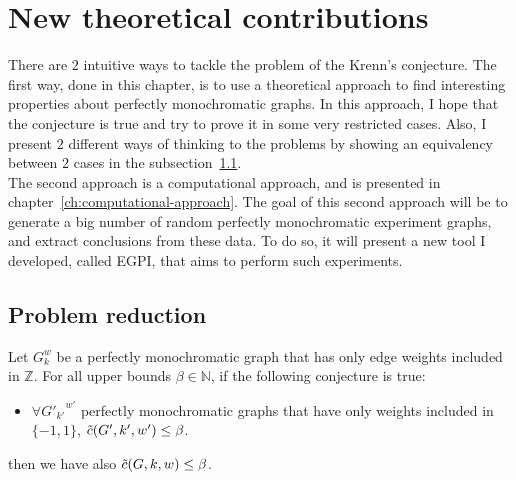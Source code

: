 \chapter{New theoretical contributions}
\label{ch:new-contributions}

There are $2$ intuitive ways to tackle the problem of the Krenn's conjecture.
The first way, done in this chapter, is to use a theoretical approach to find interesting properties about perfectly monochromatic graphs.
In this approach, I hope that the conjecture is true and try to prove it in some very restricted cases.
Also, I present $2$ different ways of thinking to the problems by showing an equivalency between $2$ cases in the subsection~\ref{sec:problem-reduction}.\\

The second approach is a computational approach, and is presented in chapter~\ref{ch:computational-approach}.
The goal of this second approach will be to generate a big number of random perfectly monochromatic experiment graphs, and extract conclusions from these data.
To do so, it will present a new tool I developed, called EGPI, that aims to perform such experiments.


\section{Problem reduction}
\label{sec:problem-reduction}

\begin{lemma}
    Let $G_k^w$ be a perfectly monochromatic graph that has only edge weights included in $\mathbb{Z}$.
    For all upper bounds $\beta \in \mathbb{N}$, if the following conjecture is true:
    \begin{itemize}
        \item $\forall {G'_{k'}}^{w'}$ perfectly monochromatic graphs that have only weights included in $\{-1, 1\}$, $\Tilde{c}(G', k', w') \leq \beta$.
    \end{itemize}
    then we have also $\Tilde{c}(G, k, w) \leq \beta$.
\end{lemma}

